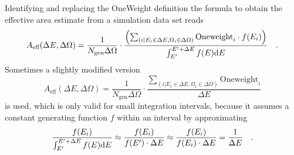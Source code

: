 Identifying and replacing the OneWeight definition the formula to obtain the effective area estimate from a simulation data set reads
\begin{equation}
  A_\text{eff}(\Delta E, \Delta \Omega) =
    \frac{1}{N_\text{gen}\Delta\Omega}\cdot
    \frac{\left(
            \sum_{(i|E_i\in\Delta E, \Omega_i\in\Delta\Omega)}
            \text{Oneweight}_i \cdot f(E_i)
          \right)}
          {\int_{E'}^{E'+\Delta E}f(E)\mathrm{d}E}
  \quad\text{.}
\end{equation}
Sometimes a slightly modified version
\begin{equation}
  A_\text{eff}(\Delta E, \Delta \Omega) =
    \frac{1}{N_\text{gen}\Delta\Omega}\cdot
    \frac{\sum_{(i|E_i\in\Delta E, \Omega_i\in\Delta\Omega)}
          \text{Oneweight}_i}
         {\Delta E}
\end{equation}
is used, which is only valid for small integration intervals, because it assumes a constant generating function $f$ within an interval by approximating
\begin{equation}
  \frac{f(E_i)}{\int_{E'}^{E'+\Delta E}f(E)\mathrm{d}E}
  \approx \frac{f(E_i)}{f(E')\cdot\Delta E}
  \approx \frac{f(E_i)}{f(E_i)\cdot\Delta E}
  = \frac{1}{\Delta E}
  \quad\text{.}
\end{equation}
